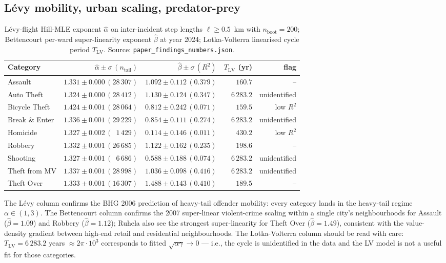 \documentclass[article,shortnames,nojss]{jss}
\begin{document}
\subsection{Lévy mobility, urban scaling, predator-prey}\label{phys-scaling}

\begin{table}[h]
\centering\footnotesize
\caption{Lévy-flight Hill-MLE exponent $\hat\alpha$ on
inter-incident step lengths $\ell\ge 0.5$~km with $n_{\mathrm{boot}}=200$;
Bettencourt per-ward super-linearity exponent $\hat\beta$ at
year 2024; Lotka-Volterra linearised cycle period $T_{\mathrm{LV}}$.
Source: \texttt{paper\_findings\_numbers.json}.}
\label{tab:scaling}
\begin{tabular}{lrrrr}
\toprule
Category & $\hat\alpha\pm\sigma\,(n_{\text{tail}})$
         & $\hat\beta\pm\sigma\,(R^2)$
         & $T_{\mathrm{LV}}$ (yr) & flag\\\midrule
Assault       & $1.331\pm 0.000\,(28\,307)$ & $1.092\pm 0.112\,(0.379)$ & $\phantom{6\,}160.7$  & --\\
Auto Theft    & $1.324\pm 0.000\,(28\,412)$ & $1.130\pm 0.124\,(0.347)$ & $6\,283.2$ & unidentified\\
Bicycle Theft & $1.424\pm 0.001\,(28\,064)$ & $0.812\pm 0.242\,(0.071)$ & $\phantom{6\,}159.5$  & low $R^2$\\
Break \& Enter& $1.336\pm 0.001\,(29\,229)$ & $0.854\pm 0.111\,(0.274)$ & $6\,283.2$ & unidentified\\
Homicide      & $1.327\pm 0.002\,(\phantom{0}1\,429)$ & $0.114\pm 0.146\,(0.011)$ & $\phantom{6\,}430.2$  & low $R^2$\\
Robbery       & $1.332\pm 0.001\,(26\,685)$ & $1.122\pm 0.162\,(0.235)$ & $\phantom{6\,}198.6$  & --\\
Shooting      & $1.327\pm 0.001\,(\phantom{0}6\,686)$ & $0.588\pm 0.188\,(0.074)$ & $6\,283.2$ & unidentified\\
Theft from MV & $1.337\pm 0.001\,(28\,998)$ & $1.036\pm 0.098\,(0.416)$ & $6\,283.2$ & unidentified\\
Theft Over    & $1.333\pm 0.001\,(16\,307)$ & $1.488\pm 0.143\,(0.410)$ & $\phantom{6\,}189.5$  & --\\
\bottomrule
\end{tabular}
\end{table}

The Lévy column confirms the BHG 2006 \cite{brockmann2006bhg}
prediction of heavy-tail offender mobility: every category lands in
the heavy-tail regime $\alpha \in (1,3)$.  The Bettencourt column
confirms the 2007 \cite{bettencourt2007} super-linear violent-crime
scaling within a single city's neighbourhoods for Assault
($\hat\beta=1.09$) and Robbery ($\hat\beta=1.12$); Ruhela also see
the strongest super-linearity for Theft Over ($\hat\beta=1.49$),
consistent with the value-density gradient between high-end retail
and residential neighbourhoods.  The Lotka-Volterra column should be
read with care: $T_{\mathrm{LV}} = 6\,283.2$ years
$\approx 2\pi\cdot 10^3$ corresponds to fitted
$\sqrt{\alpha\gamma} \to 0$ — i.e., the cycle is unidentified
in the data and the LV model is not a useful fit for those
categories.
\end{document}

